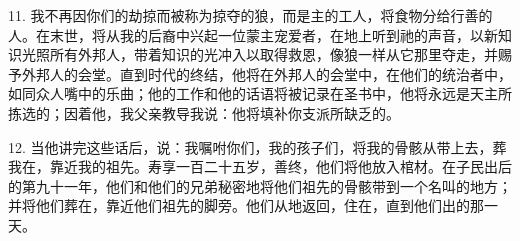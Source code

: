 11. 我不再因你们的劫掠而被称为掠夺的狼，而是主的工人，将食物分给行善的人。在末世，将从我的后裔中兴起一位蒙主宠爱者，在地上听到祂的声音，以新知识光照所有外邦人，带着知识的光冲入以取得救恩，像狼一样从它那里夺走，并赐予外邦人的会堂。直到时代的终结，他将在外邦人的会堂中，在他们的统治者中，如同众人嘴中的乐曲；他的工作和他的话语将被记录在圣书中，他将永远是天主所拣选的；因着他，我父亲教导我说：他将填补你支派所缺乏的。\par

12. 当他讲完这些话后，说：我嘱咐你们，我的孩子们，将我的骨骸从带上去，葬我在，靠近我的祖先。寿享一百二十五岁，善终，他们将他放入棺材。在子民出后的第九十一年，他们和他们的兄弟秘密地将他们祖先的骨骸带到一个名叫的地方；并将他们葬在，靠近他们祖先的脚旁。他们从地返回，住在，直到他们出的那一天。\par

